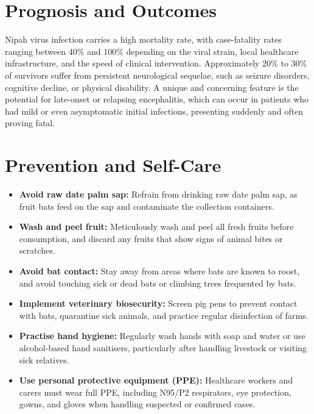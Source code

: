\section*{Prognosis and Outcomes}
Nipah virus infection carries a high mortality rate, with case-fatality rates ranging between 40\% and 100\% depending on the viral strain, local healthcare infrastructure, and the speed of clinical intervention. Approximately 20\% to 30\% of survivors suffer from persistent neurological sequelae, such as seizure disorders, cognitive decline, or physical disability. A unique and concerning feature is the potential for late-onset or relapsing encephalitis, which can occur in patients who had mild or even asymptomatic initial infections, presenting suddenly and often proving fatal.

\section*{Prevention and Self-Care}
\begin{itemize}
    \item \textbf{Avoid raw date palm sap:} Refrain from drinking raw date palm sap, as fruit bats feed on the sap and contaminate the collection containers.
    \item \textbf{Wash and peel fruit:} Meticulously wash and peel all fresh fruits before consumption, and discard any fruits that show signs of animal bites or scratches.
    \item \textbf{Avoid bat contact:} Stay away from areas where bats are known to roost, and avoid touching sick or dead bats or climbing trees frequented by bats.
    \item \textbf{Implement veterinary biosecurity:} Screen pig pens to prevent contact with bats, quarantine sick animals, and practice regular disinfection of farms.
    \item \textbf{Practise hand hygiene:} Regularly wash hands with soap and water or use alcohol-based hand sanitisers, particularly after handling livestock or visiting sick relatives.
    \item \textbf{Use personal protective equipment (PPE):} Healthcare workers and carers must wear full PPE, including N95/P2 respirators, eye protection, gowns, and gloves when handling suspected or confirmed cases.
\end{itemize}

